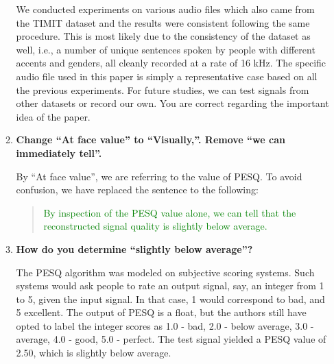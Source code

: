 \documentclass[a4paper,12pt]{article}
\begin{document}
\begin{enumerate}
\begin{enumerate}
			We conducted experiments on various audio files which also came from the TIMIT dataset and the results were consistent following the same procedure. This is most likely due to the consistency of the dataset as well, i.e., a number of unique sentences spoken by people with different accents and genders, all cleanly recorded at a rate of 16 kHz. The specific audio file used in this paper is simply a representative case based on all the previous experiments. For future studies, we can test signals from other datasets or record our own. You are correct regarding the important idea of the paper.
			
			
			\item \textbf{Change ``At face value'' to ``Visually,''. Remove ``we can immediately tell''.}
			
			By ``At face value'', we are referring to the value of PESQ. To avoid confusion, we have replaced the sentence to the following:
			
			\begin{quotation}
				\textcolor{Green}{By inspection of the PESQ value alone, we can tell that the reconstructed signal quality is slightly below average.}
			\end{quotation}
			
			
			\item \textbf{How do you determine ``slightly below average''?}
			
			The PESQ algorithm was modeled on subjective scoring systems. Such systems would ask people to rate an output signal, say, an integer from 1 to 5, given the input signal. In that case, 1 would correspond to bad, and 5 excellent. The output of PESQ is a float, but the authors still have opted to label the integer scores as 1.0 - bad, 2.0 - below average, 3.0 - average, 4.0 - good, 5.0 - perfect. The test signal yielded a PESQ value of 2.50, which is slightly below average.
		\end{enumerate}
\end{enumerate}
\end{document}
